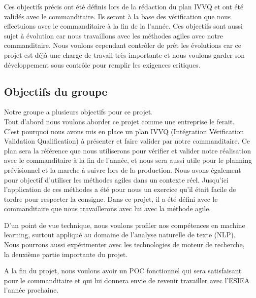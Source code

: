 Ces objectifs précis ont été définis lors de la rédaction du plan IVVQ et ont été validés avec le commanditaire.
Ils seront à la base des vérification que nous effectuions avec le commanditaire à la fin de la l'année.
Ces objectifs sont aussi sujet à évolution car nous travaillons avec les méthodes agiles avec notre commanditaire.
Nous voulons cependant contrôler de prêt les évolutions car ce projet est déjà une charge de travail très importante et nous voulons garder son développement sous contrôle pour remplir les exigences critiques.


\subsection {Objectifs du groupe}
Notre groupe a plusieurs objectifs pour ce projet.
\\
Tout d'abord nous voulons aborder ce projet comme une entreprise le ferait.
C'est pourquoi nous avons mis en place un plan IVVQ (Intégration Vérification Validation Qualification) à présenter et faire valider par notre commanditaire.
Ce plan sera la référence que nous utiliserons pour vérifier et valider notre réalisation avec le commanditaire à la fin de l'année, et nous sera aussi utile pour le planning prévisionnel et la marche à suivre lors de la production.
Nous avons également pour objectif d'utiliser les méthodes agiles dans un contexte réel.
Jusqu'ici l'application de ces méthodes a été pour nous un exercice qu'il était facile de tordre pour respecter la consigne.
Dans ce projet, il a été défini avec le commanditaire que nous travaillerons avec lui avec la méthode agile.
\\
\par
D'un point de vue technique, nous voulons profiler nos compétences en machine learning, surtout appliqué au domaine de l'analyse naturelle de texte (NLP).
Nous pourrons aussi expérimenter avec les technologies de moteur de recherche, la deuxième partie importante du projet.
\\
\par
A la fin du projet, nous voulons avoir un POC fonctionnel qui sera satisfaisant pour le commanditaire et qui lui donnera envie de revenir travailler avec l'ESIEA l'année prochaine.





